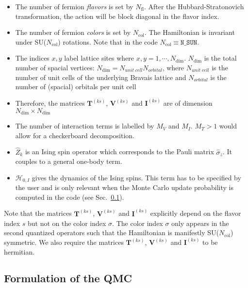\begin{itemize}
\item The number of fermion \textit{flavors} is set by $N_{\mathrm{fl}}$.  After the Hubbard-Stratonovich transformation, the action will be block diagonal in the flavor index. 
\item The number of fermion \textit{colors} is set by $N_{\mathrm{col}}$.    The Hamiltonian is invariant under  SU($N_{\mathrm{col}}$)  rotations. Note that  in the code $ N_{\mathrm{col}} \equiv \texttt{N\_{SUN}} $. 
\item The indices $x,y$ label lattice sites where $x,y=1,\cdots, N_{\mathrm{dim}}$. 
$N_{\mathrm{dim}}$ is the total number of spacial vertices: $N_{\mathrm{dim}}=N_{unit\;cell} N_{orbital}$, where $N_{unit\;cell}$ is the number of unit cells of the underlying Bravais lattice and $N_{orbital}$ is the number of (spacial) orbitals per unit cell  
\item Therefore, the  matrices $\bm{T}^{(k s)}$, $\bm{V}^{(ks)}$  and $\bm{I}^{(ks)}$ are  of dimension $N_{\mathrm{dim}}\times N_{\mathrm{dim}}$
\item The number of interaction terms  is labelled by $M_V$   and $M_I$.   $M_T> 1 $ would allow for a checkerboard decomposition. 
\item $\hat{Z}_k$ is an Ising spin operator which corresponds to the Pauli matrix $\hat{\sigma}_{z}$. It couples to a general one-body term. 
\item  $\mathcal{H}_{0,I}$  gives the dynamics of the Ising spins. 
This term has to be specified by the user and is only relevant when the Monte Carlo update probability is computed in the code (see Sec.~\ref{}).
\end{itemize}
Note that the matrices  $\bm{T}^{(ks)}$,  $\bm{V}^{(ks)}$ and  $\bm{I}^{(ks)}$ explicitly depend on the flavor index $s$ but not on the color index $\sigma$. 
The color index $\sigma$ only appears in  the  second quantized operators such that the Hamiltonian is manifestly SU($N_{\mathrm{col}}$)    symmetric.  We also require
the matrices $\bm{T}^{(ks)}$,  $\bm{V}^{(ks)}$ and  $\bm{I}^{(ks)}$  to be  hermitian.


\subsection{Formulation of the QMC}  
